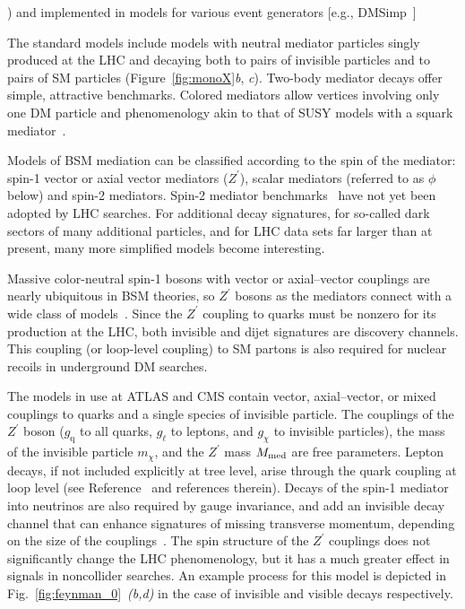 \documentclass{ar-1col}
\newcommand{\chiDM}{\ensuremath{\chi}\xspace}
\newcommand{\IP}{invisible particle}
\newcommand{\mMed}{\ensuremath{M_{\rm{med}}}\xspace}
\newcommand{\mmed}{\mMed}
\newcommand{\gDM}{\ensuremath{g_{\chiDM}}\xspace}
\newcommand{\gl}{$g_{\ell}$\xspace}
\newcommand{\gq}{$g_{\mathrm{q}}$\xspace}
\newcommand{\mdm}{\ensuremath{m_{\chiDM}}\xspace}
\newcommand{\Zprime}{\ensuremath{{Z}^\prime}\xspace}
\begin{document}
\begin{marginnote}[]
)
and implemented in models for various event generators [e.g.,
DMSimp~\cite{Backovic:2015soa}]
\end{marginnote}

The standard models include models with neutral mediator particles
singly produced at the LHC and decaying both to pairs of {\IP}s and to
pairs of SM particles (Figure~\ref{fig:monoX}{\em b},{\em
c}). Two-body mediator decays offer simple, attractive benchmarks.
Colored mediators allow vertices involving only one DM particle
and phenomenology akin to that of SUSY models with a squark
mediator~\cite{Papucci:2014iwa,An:2013xka,Bell:2012rg}.

Models of BSM mediation can be classified according to the spin of
the mediator: spin-1 vector or axial vector mediators (\Zprime),
scalar mediators (referred to as $\phi$ below) and spin-2
mediators. Spin-2 mediator benchmarks~\cite{Han:2015cty} have not yet been adopted by
LHC searches.
For additional decay signatures, for so-called dark sectors of many
additional particles, and for LHC data sets far larger than at
present, many more simplified models become interesting.

{Massive color-neutral spin-1 bosons with vector or
axial--vector couplings} are nearly ubiquitous in BSM theories, so
\Zprime bosons as the mediators connect with a wide class of
models~\cite{Shoemaker:2011vi}. Since the \Zprime coupling to
quarks must be nonzero for its production at the LHC, both
invisible and dijet signatures are discovery channels. This
coupling (or loop-level coupling) to SM partons is also required
for nuclear recoils in underground DM searches.

The models in use at ATLAS and CMS contain vector,
axial--vector, or mixed couplings to quarks and a single species of
{\IP}. The couplings of the \Zprime boson (\gq to all quarks, \gl to
leptons, and \gDM to {\IP}s), the mass of the invisible particle \mdm, and the
\Zprime mass \mmed are free parameters. Lepton decays, if not
included explicitly at tree level, arise through the quark
coupling at loop level (see Reference~ and
references therein). Decays of the spin-1 mediator into neutrinos
are also required by gauge invariance, and add an invisible decay
channel that can enhance signatures of missing transverse
momentum, depending on the size of the
couplings~\cite{Albert:2017onk}. The spin structure of the \Zprime
couplings does not significantly change the LHC phenomenology, but it
has a much greater effect in signals in noncollider searches.
An example process for this model is depicted in Fig.~\ref{fig:feynman_0}~\textit{(b,d)} in
the case of invisible and visible decays respectively.
\end{document}
